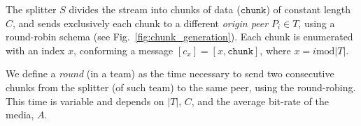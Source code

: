 \label{sec:chunk_generation}
\begin{figure*}
  \caption{Chunk generation at the splitter.\label{fig:chunk_generation}}
\end{figure*}
The splitter $S$ divides the stream into chunks of data
($\mathtt{chunk}$) of constant length $C$, and sends exclusively each
chunk to a different \emph{origin peer} $P_i\in T$, using a
round-robin schema (see Fig.~\ref{fig:chunk_generation}). Each chunk
is enumerated with an index $x$, conforming a message
$[c_x]=[x,\mathtt{chunk}]$, where $x=i \mathrm{mod} |T|$.

We define a \emph{round} (in a team) as the time necessary to send two
consecutive chunks from the splitter (of such team) to the same peer,
using the round-robing. This time is variable and depends on $|T|$,
$C$, and the average bit-rate of the media, $A$.

\begin{comment}
The round-time is defined by:
\begin{equation}
  \cal{r} = \cal{c}N.
  \label{eq:round_time}
\end{equation}
For example, if we use only one team of $N=256$ peers, a chunk size
$C=1024$~bytes, and a video of $1$~Mb/s, the round time is
\begin{displaymath}
  \cal{r} = \frac{1024\frac{\text{bytes}}{\text{chunk}}\times
    8\frac{\text{bits}}{\text{byte}}}{10^6\frac{\text{bits}}{\text{second}}}\times
  256 \approx 2.1~\text{seconds}.
\end{displaymath}
\end{comment}
